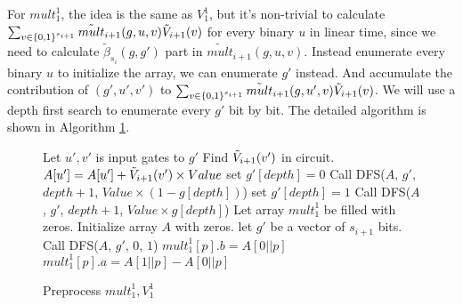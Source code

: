 {	For ${mult}_1^1$, the idea is the same as ${V}_1^1$, but it's non-trivial to calculate $\sum_{v\in \{0,1\}^{s_{i+1}}}\tilde{mult}_{i+1}(g, u, v)\tilde{V}_{i+1}(v)$ for every binary $u$ in linear time, since we need to calculate $\tilde{\beta}_{s_{i}}(g, g')$ part in $\tilde{mult}_{i+1}(g, u, v)$. Instead enumerate every binary $u$ to initialize the array, we can enumerate $g'$ instead. And accumulate the contribution of $(g', u', v')$ to $\sum_{v\in \{0,1\}^{s_{i+1}}}\tilde{mult}_{i+1}(g, u', v)\tilde{V}_{i+1}(v)$. We will use a depth first search to enumerate every $g'$ bit by bit. The detailed algorithm is shown in Algorithm \ref{alg::premult}.
	\begin{figure}[p]
		\begin{algorithm}[H]
			\label{alg::premult}
			\caption{Preprocess ${mult}_1^1, {V}_1^1$}
			\begin{algorithmic}[1]
				 
				\State Let $u', v'$ is input gates to $g'$
				\State Find $\tilde{V}_{i+1}(v')$ in circuit.
				\State $A[u'] = A[u'] + \tilde{V}_{i+1}(v')\times Value$
				\Else
				\State set $g'[depth]=0$
				\State Call {\sf DFS}($A$, $g'$, $depth+1$, $Value\times(1-g[depth])$)
				\State set $g'[depth]=1$
				\State Call {\sf DFS}($A$, $g'$, $depth+1$, $Value\times g[depth]$)
				\EndIf
				\EndProcedure
				\State Let array ${mult}_1^1$ be filled with zeros.
				\State Initialize array $A$ with zeros.
				\State let $g'$ be a vector of $s_{i+1}$ bits.
				\State Call {\sf DFS}($A$, $g'$, $0$, $1$)
				\State ${mult}_1^1[p].b=A[0||p]$
				\State ${mult}_1^1[p].a=A[1||p]-A[0||p]$
				\EndFor
				\EndProcedure
			\end{algorithmic}
		\end{algorithm}
	\end{figure}
	
}
